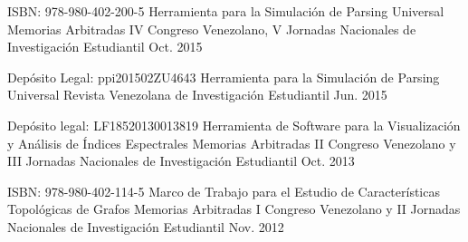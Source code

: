 \begin{cventries}
	\cventry
	{ISBN: 978-980-402-200-5}
	{Herramienta para la Simulación de Parsing Universal}
	{Memorias Arbitradas IV Congreso Venezolano, V Jornadas Nacionales de Investigación Estudiantil}
	{Oct. 2015}
	{
	}
    
	\cventry
	{Depósito Legal: ppi201502ZU4643}
	{Herramienta para la Simulación de Parsing Universal}
	{Revista Venezolana de Investigación Estudiantil}
	{Jun. 2015}
	{
	}
	    
	\cventry
	{Depósito legal: LF18520130013819}
	{Herramienta de Software para la Visualización y Análisis de Índices Espectrales}
	{Memorias Arbitradas II Congreso Venezolano y III Jornadas Nacionales de Investigación Estudiantil}
	{Oct. 2013}
	{
	}
	    
	\cventry
	{ISBN: 978-980-402-114-5}
	{Marco de Trabajo para el Estudio de Características Topológicas de Grafos }
	{Memorias Arbitradas I Congreso Venezolano y II Jornadas Nacionales de Investigación Estudiantil}
	{Nov. 2012}
	{
	}
\end{cventries}